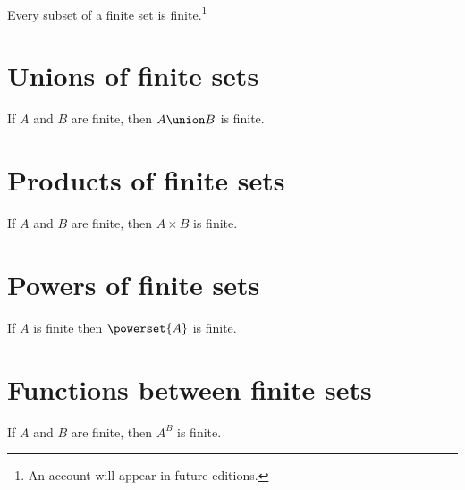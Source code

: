 \begin{proposition}
Every subset of a finite set is finite.\footnote{An account will appear in future editions.}
\end{proposition}

\section*{Unions of finite sets}

\begin{proposition}
If $A$ and $B$ are finite, then $A \union B$ is finite.
\end{proposition}

\section*{Products of finite sets}

\begin{proposition}
If $A$ and $B$ are finite, then $A \times B$ is finite.
\end{proposition}

\section*{Powers of finite sets}

\begin{proposition}
If $A$ is finite then $\powerset{A}$ is finite.
\end{proposition}

\section*{Functions between finite sets}

\begin{proposition}
If $A$ and $B$ are finite, then $A^B$ is finite.
\end{proposition}
